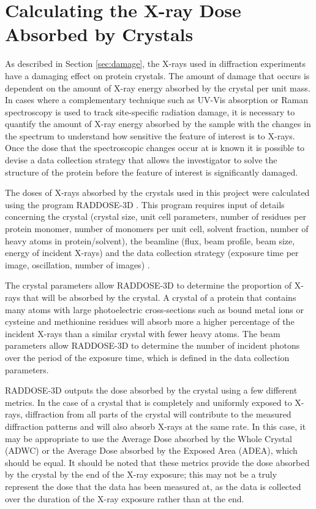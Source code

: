      
\clearpage 
\section{Calculating the X-ray Dose Absorbed by Crystals}

As described in Section \ref{sec:damage}, the X-rays used in diffraction experiments have a damaging effect on protein crystals. The amount of damage that occurs is dependent on the amount of X-ray energy absorbed by the crystal per unit mass. In cases where a complementary technique such as UV-Vis absorption or Raman spectroscopy is used to track site-specific radiation damage, it is necessary to quantify the amount of X-ray energy absorbed by the sample with the changes in the spectrum to understand how sensitive the feature of interest is to X-rays. Once the dose that the spectroscopic changes occur at is known it is possible to devise a data collection strategy that allows the investigator to solve the structure of the protein before the feature of interest is significantly damaged.    

The doses of X-rays absorbed by the crystals used in this project were calculated using the program RADDOSE-3D \cite{Zeldin2013}. This program requires input of details concerning the crystal (crystal size, unit cell parameters, number of residues per protein monomer, number of monomers per unit cell, solvent fraction, number of heavy atoms in protein/solvent), the  beamline (flux, beam profile, beam size, energy of incident X-rays) and the data collection strategy (exposure time per image, oscillation, number of images) \cite{Zeldin2013}. 

The crystal parameters allow RADDOSE-3D to determine the proportion of X-rays that will be absorbed by the crystal. A crystal of a protein that contains many atoms with large photoelectric cross-sections such as bound metal ions or cysteine and methionine residues will absorb more a higher percentage of the incident X-rays than a similar crystal with fewer heavy atoms. The beam parameters allow RADDOSE-3D to determine the number of incident photons over the period of the exposure time, which is defined in the data collection parameters.  

RADDOSE-3D outputs the dose absorbed by the crystal using a few different metrics. In the case of a crystal that is completely and uniformly exposed to X-rays, diffraction from all parts of the crystal will contribute to the measured diffraction patterns and will also absorb X-rays at the same rate. In this case, it may be appropriate to use the Average Dose absorbed by the Whole Crystal (ADWC) or the Average Dose absorbed by the Exposed Area (ADEA), which should be equal. It should be noted that these metrics provide the dose absorbed by the crystal by the end of the X-ray exposure; this may not be a truly represent the dose that the data has been measured at, as the data is collected over the duration of the X-ray exposure rather than at the end.     

